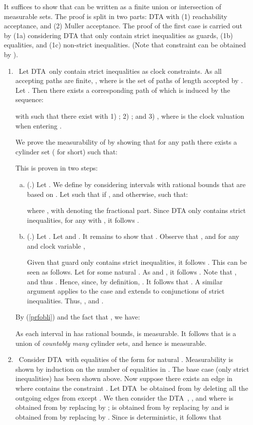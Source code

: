 \documentclass{LMCS}
\newcommand{\<}{\langle}
\renewcommand{\>}{\rangle}
\newcommand{\DTA}{\textsc{DTA}}
\newcommand{\DTAr}{\DTA}
\begin{document}
\proof
It suffices to show that  can be written as a finite union or
intersection of measurable sets.
The proof is split in two parts: DTA with (1) reachability acceptance, and (2) Muller acceptance.
The proof of the first case is carried out by (1a) considering DTA that only contain strict
inequalities as guards, (1b) equalities, and (1c) non-strict inequalities.
(Note that constraint  can be obtained by ).
\begin{enumerate}
\item{}\
Let \DTAr\  only contain strict inequalities as clock constraints.
As all accepting paths are finite, , where  is the set of paths
of length  accepted by .
Let .
Then there exists a corresponding path  of  which is induced by the sequence:

with  such that there exist 
with 1) ; 2) ; and 3) , where  is the clock valuation when entering .

We prove the measurability of  by showing that for any path
 there exists
a cylinder set  ( for short) such that:

This is proven in two steps:
\begin{enumerate}[a.]
\item
(.)
Let .
We define  by considering intervals  with rational bounds that are based on
.
Let  such that  if , and
 otherwise, such that:

where
,
with  denoting the fractional part.
Since DTA  only contains strict inequalities, for any  with , it follows .
\item
(.)
Let .
Let  and .
It remains to show that .
Observe that , and for any  and clock variable ,

Given that guard  only contains strict inequalities, it follows .
This can be seen as follows.
Let  for some natural .
As  and ,
it follows .
Note that , and thus
.
Hence,  since, by definition, .
It follows that .
A similar argument applies to the case  and extends to conjunctions of strict
inequalities.
Thus, , and .
\end{enumerate}
By (\ref{prfobli}) and the fact that , we have:

As each interval in  has rational bounds,  is measurable.
It follows that  is a union of \emph{countably many}
cylinder sets, and hence is measurable.

\item{}\
Consider \DTAr\  with equalities of the form  for natural .
Measurability is shown by induction on the number of equalities in .
The base case (only strict inequalities) has been shown above.
Now suppose there exists an edge  in  where
 contains the constraint .
Let \DTAr\  be obtained from  by deleting all the outgoing
edges from  except .
We then consider the \DTA\ , , and
 where  is obtained from
 by replacing  by ;  is obtained
from  by replacing  by  and  is
obtained from  by replacing  by .
Since  is deterministic, it follows that


\end{enumerate}
\end{document}
